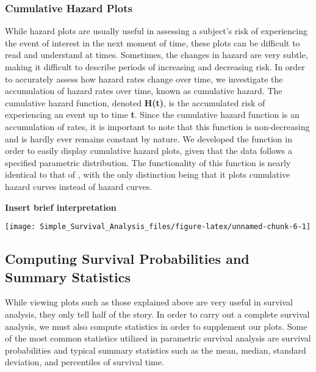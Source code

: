 \hypertarget{cumulative-hazard-plots}{%
\subsubsection{Cumulative Hazard Plots}\label{cumulative-hazard-plots}}

While hazard plots are usually useful in assessing a subject's risk of
experiencing the event of interest in the next moment of time, these
plots can be difficult to read and understand at times. Sometimes, the
changes in hazard are very subtle, making it difficult to describe
periods of increasing and decreasing risk. In order to accurately assess
how hazard rates change over time, we investigate the accumulation of
hazard rates over time, known as cumulative hazard. The cumulative
hazard function, denoted \textbf{H(t)}, is the accumulated risk of
experiencing an event up to time \textbf{t}. Since the cumulative hazard
function is an accumulation of rates, it is important to note that this
function is non-decreasing and is hardly ever remains constant by
nature. We developed the function  in order to easily
display cumulative hazard plots, given that the data follows a specified
parametric distribution. The functionality of this function is nearly
identical to that of , with the only distinction being
that it plots cumulative hazard curves instead of hazard curves.

\textbf{Insert brief interpretation}

\begin{Schunk}

\texttt{[image: Simple\_Survival\_Analysis\_files/figure-latex/unnamed-chunk-6-1]} \end{Schunk}

\hypertarget{computing-survival-probabilities-and-summary-statistics}{%
\subsection{Computing Survival Probabilities and Summary
Statistics}\label{computing-survival-probabilities-and-summary-statistics}}

While viewing plots such as those explained above are very useful in
survival analysis, they only tell half of the story. In order to carry
out a complete survival analysis, we must also compute statistics in
order to supplement our plots. Some of the most common statistics
utilized in parametric survival analysis are survival probabilities and
typical summary statistics such as the mean, median, standard deviation,
and percentiles of survival time.

